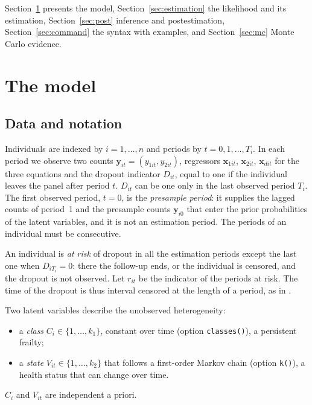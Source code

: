 \documentclass[11pt,a4paper]{article}
\newcommand{\cmd}[1]{\texttt{#1}}
\newcommand{\yv}{\mathbf y}
\newcommand{\xv}{\mathbf x}
\begin{document}
Section~\ref{sec:model} presents the model, Section~\ref{sec:estimation} the likelihood and its
estimation, Section~\ref{sec:post} inference and postestimation, Section~\ref{sec:command} the syntax
with examples, and Section~\ref{sec:mc} Monte Carlo evidence.

\section{The model}\label{sec:model}

\subsection{Data and notation}

Individuals are indexed by $i=1,\dots,n$ and periods by $t=0,1,\dots,T_i$. In each period we observe two
counts $\yv_{it}=(y_{1it},y_{2it})$, regressors $\xv_{1it}$, $\xv_{2it}$, $\xv_{dit}$ for the three
equations and the dropout indicator $D_{it}$, equal to one if the individual leaves the panel after
period $t$. $D_{it}$ can be one only in the last observed period $T_i$. The first observed period,
$t=0$, is the \emph{presample period}: it supplies the lagged counts of period~1 and the presample
counts $\yv_{i0}$ that enter the prior probabilities of the latent variables, and it is not an
estimation period. The periods of an individual must be consecutive.

An individual is \emph{at risk} of dropout in all the estimation periods except the last one when
$D_{iT_i}=0$: there the follow-up ends, or the individual is censored, and the dropout is not
observed. Let $r_{it}$ be the indicator of the periods at risk. The time of the dropout is thus
interval censored at the length of a period, as in \citet[eq.~6]{carrieri2026}.

Two latent variables describe the unobserved heterogeneity:
\begin{itemize}
\item a \emph{class} $C_i\in\{1,\dots,k_1\}$, constant over time (option \cmd{classes()}), a persistent
frailty;
\item a \emph{state} $V_{it}\in\{1,\dots,k_2\}$ that follows a first-order Markov chain (option
\cmd{k()}), a health status that can change over time.
\end{itemize}
$C_i$ and $V_{it}$ are independent a priori.
\end{document}
